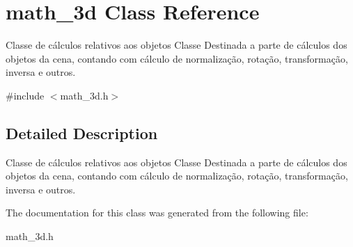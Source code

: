 \hypertarget{classmath__3d}{\section{math\-\_\-3d Class Reference}
\label{classmath__3d}
}


Classe de cálculos relativos aos objetos Classe Destinada a parte de cálculos dos objetos da cena, contando com cálculo de normalização, rotação, transformação, inversa e outros.  




{\ttfamily \#include $<$math\-\_\-3d.\-h$>$}



\subsection{Detailed Description}
Classe de cálculos relativos aos objetos Classe Destinada a parte de cálculos dos objetos da cena, contando com cálculo de normalização, rotação, transformação, inversa e outros. 

The documentation for this class was generated from the following file\-:\begin{DoxyCompactItemize}
\item 
math\-\_\-3d.\-h\end{DoxyCompactItemize}
